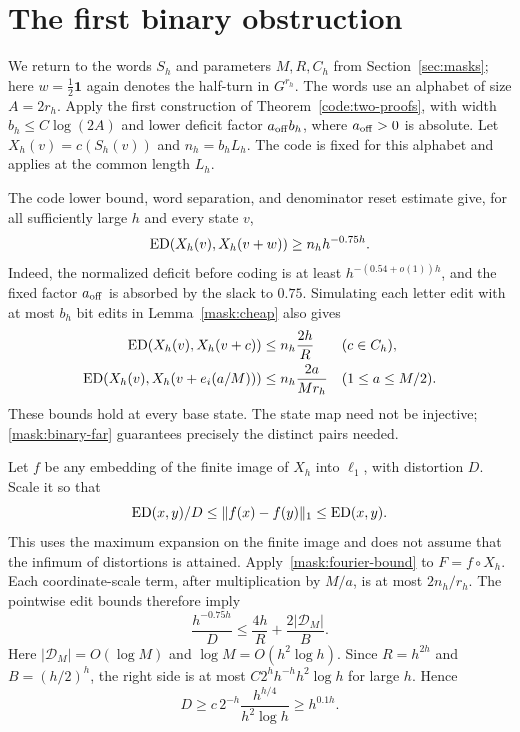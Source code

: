 \section{The first binary obstruction}\label{sec:mask-binary}

We return to the words $S_h$ and parameters $M,R,C_h$ from
Section~\ref{sec:masks}; here $w=\tfrac12\mathbf1$ again denotes the
half-turn in $G^{r_h}$. The words use an alphabet of size $A=2r_h$.
Apply the first construction of
Theorem~\ref{code:two-proofs}, with width $b_h\leq C\log(2A)$ and lower
deficit factor $a_{\rm off}b_h$, where $a_{\rm off}>0$ is absolute.
Let $X_h(v)=c(S_h(v))$ and $n_h=b_hL_h$. The code is fixed for this
alphabet and applies at the common length $L_h$.

The code lower bound, word separation, and denominator reset estimate give,
for all sufficiently large $h$ and every state $v$,
\begin{equation}\label{mask:binary-far}
 \operatorname{ED}(X_h(v),X_h(v+w))\geq n_h h^{-0.75h}.
\end{equation}
Indeed, the normalized deficit before coding is at least
$h^{-(0.54+o(1))h}$, and the fixed factor $a_{\rm off}$ is absorbed by the
slack to $0.75$. Simulating each letter edit with at most $b_h$ bit edits
in Lemma~\ref{mask:cheap} also gives
\begin{align}
 \operatorname{ED}(X_h(v),X_h(v+c))&\leq n_h\frac{2h}{R}
        &&(c\in C_h),\label{mask:binary-subgroup}\\
 \operatorname{ED}(X_h(v),X_h(v+e_i(a/M)))&\leq n_h\frac{2a}{Mr_h}
        &&(1\leq a\leq M/2).\label{mask:binary-leaf}
\end{align}
These bounds hold at every base state. The state map need not be injective;
\eqref{mask:binary-far} guarantees precisely the distinct pairs needed.

Let $f$ be any embedding of the finite image of $X_h$ into $\ell_1$, with
distortion $D$. Scale it so that
\[
 \operatorname{ED}(x,y)/D\leq\|f(x)-f(y)\|_1\leq\operatorname{ED}(x,y).
\]
This uses the maximum expansion on the finite image and does not assume
that the infimum of distortions is attained. Apply~\eqref{mask:fourier-bound}
to $F=f\circ X_h$. Each coordinate-scale term, after multiplication by
$M/a$, is at most $2n_h/r_h$. The pointwise edit bounds therefore imply
\begin{equation}\label{mask:distortion-estimate}
 \frac{h^{-0.75h}}D\leq\frac{4h}{R}
              +\frac{2|\mathcal D_M|}{B}.
\end{equation}
Here $|\mathcal D_M|=O(\log M)$ and $\log M=O(h^2\log h)$.
Since $R=h^{2h}$ and $B=(h/2)^h$, the right side is at most
$C2^h h^{-h}h^2\log h$ for large $h$. Hence
\begin{equation}\label{mask:distortion}
 D\geq c\,2^{-h}\frac{h^{h/4}}{h^2\log h}\geq h^{0.1h}.
\end{equation}

